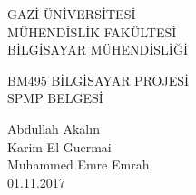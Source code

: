 \begin{titlepage}
   \begin{center}
      \begin{large}
         \vspace*{0.5cm}
         GAZİ ÜNİVERSİTESİ \\
         MÜHENDİSLİK FAKÜLTESİ \\
         BİLGİSAYAR MÜHENDİSLİĞİ

         \vfill
         BM495  BİLGİSAYAR PROJESİ \\
         SPMP BELGESİ

         \vfill
         Abdullah Akalın\\Karim El Guermai\\Muhammed Emre Emrah\\

         \vfill
         \vspace{0.5cm}
         01.11.2017
      \end{large}
   \end{center}
\end{titlepage}
